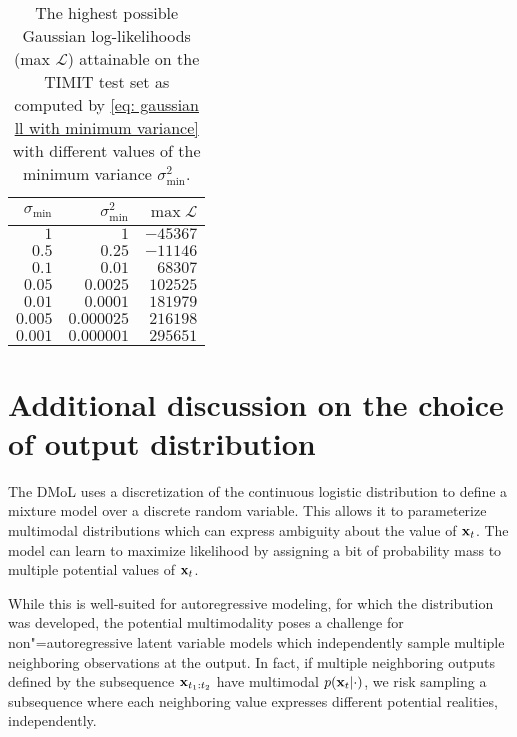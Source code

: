 {\begin{table}
    \caption[The highest possible Gaussian log-likelihoods attainable on the TIMIT test set.]{The highest possible Gaussian log-likelihoods (max $\mathcal{L}$) attainable on the TIMIT test set as computed by \eqref{eq: gaussian ll with minimum variance} with different values of the minimum variance $\sigma^2_\text{min}$.}
    \centering
    \begin{tabular}{rrr}
    \toprule
    $\sigma_\text{min}$ & $\sigma_\text{min}^2$ & $\max\mathcal{L}$ \\
    \midrule
    $1$      & $1$           &    $-45367$ \\
    $0.5$    & $0.25$        &    $-11146$ \\
    $0.1$    & $0.01$        &     $68307$ \\
    $0.05$   & $0.0025$      &    $102525$ \\
    $0.01$   & $0.0001$      &    $181979$ \\
    $0.005$  & $0.000025$    &    $216198$ \\
    $0.001$  & $0.000001$    &    $295651$ \\
    \bottomrule
    \end{tabular}
    \vspace{2mm}
    \label{tab:timit best gaussian ll}
\end{table}



\section{Additional discussion on the choice of output distribution}\label{app: additional discussion on output distribution}
The DMoL uses a discretization of the continuous logistic distribution to define a mixture model over a discrete random variable. This allows it to parameterize multimodal distributions which can express ambiguity about the value of ${\mathbf{x}}_t$.
The model can learn to maximize likelihood by assigning a bit of probability mass to multiple potential values of ${\mathbf{x}}_t$.

While this is well-suited for autoregressive modeling, for which the distribution was developed, the potential multimodality poses a challenge for non"=autoregressive latent variable models which independently sample multiple neighboring observations at the output.
In fact, if multiple neighboring outputs defined by the subsequence ${\mathbf{x}}_{t_1:t_2}$ have multimodal $p({\mathbf{x}}_t|\cdot)$, we risk sampling a subsequence where each neighboring value expresses different potential realities, independently. 

}
